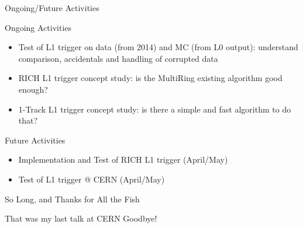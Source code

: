 \begin{frame}{Ongoing/Future Activities}{}
	\begin{block}{Ongoing Activities}
		\begin{itemize}
		  \item Test of L1 trigger on data (from 2014) and MC (from L0 output): understand comparison,
			accidentals and handling of corrupted data
			\item RICH L1 trigger concept study: is the MultiRing existing algorithm good
			enough?
			\item 1-Track L1 trigger concept study: is there a simple and fast algorithm to
			do that?
		\end{itemize}
	\end{block}
	
	\begin{block}{Future Activities}
		\begin{itemize}
			\item Implementation and Test of RICH L1 trigger (April/May)
			\item Test of L1 trigger @ CERN (April/May)
		\end{itemize}
	\end{block}
\end{frame}

\begin{frame}{So Long, and Thanks for All the Fish}{}
	\begin{block}{That was my last talk at CERN}
		Goodbye!
	\end{block}
\end{frame}